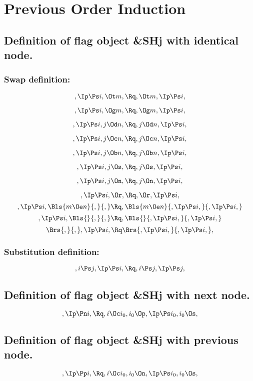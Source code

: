 
\chapter{Previous Order Induction}
\section{Definition of flag object \&SHj with identical node.}


\subsection{Swap definition:}
\[,\Ip \Ps i, \Ot m, \Rq , \Ot m, \Ip \Ps i,\]

\[,\Ip \Ps i, \Og m, \Rq , \Og m, \Ip \Ps i,\]

\[,\Ip \Ps i, j \Od n, \Rq , j \Od n, \Ip \Ps i,\]

\[,\Ip \Ps i, j \Oc n, \Rq , j \Oc n, \Ip \Ps i,\]

\[,\Ip \Ps i, j \Ob n, \Rq , j \Ob n, \Ip \Ps i,\]

\[,\Ip \Ps i, j \Os, \Rq , j \Os, \Ip \Ps i,\]

\[,\Ip \Ps i, j \On, \Rq , j \On, \Ip \Ps i,\]

\[,\Ip \Ps i, \Or, \Rq , \Or, \Ip \Ps i,\]
\bigskip
\[,\Ip \Ps i, \Bls{m \Oe n}{,}{,} \Rq , \Bls{m \Oe n}{,\Ip \Ps i,}{,\Ip \Ps i,}\]
\bigskip
\[,\Ip \Ps i, \Bls{}{,}{,} \Rq , \Bls{}{,\Ip \Ps i,}{,\Ip \Ps i,}\]
\bigskip
\[ \Brs{,}{,},\Ip \Ps i, \Rq \Brs{,\Ip \Ps i,}{,\Ip \Ps i,},\]




\bigskip
\bigskip
\subsection{Substitution definition:}
\[,i \Ps j, \Ip \Ps i, \Rq , i\Ps j, \Ip \Ps j,\]



\bigskip
\bigskip
\bigskip
\bigskip
\section{Definition of flag object \&SHj with next node.}
\[, \Ip \Pn i, \Rq , i \Oc i_0, i_0 \Op, \Ip \Ps i_0, i_0 \Os,\]


\bigskip
\bigskip
\bigskip
\bigskip
\section{Definition of flag object \&SHj with previous node.}
\[, \Ip \Pp i, \Rq , i \Oc i_0, i_0 \On, \Ip \Ps i_0, i_0 \Os,\]


